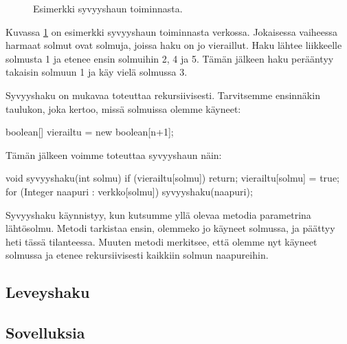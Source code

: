 \begin{figure}
\begin{center}
\end{center}
\caption{Esimerkki syvyyshaun toiminnasta.}
\label{fig:syvhak}
\end{figure}

Kuvassa \ref{fig:syvhak} on esimerkki syvyyshaun toiminnasta verkossa.
Jokaisessa vaiheessa harmaat solmut ovat solmuja,
joissa haku on jo vieraillut.
Haku lähtee liikkeelle solmusta 1 ja etenee ensin
solmuihin 2, 4 ja 5.
Tämän jälkeen haku perääntyy takaisin solmuun 1
ja käy vielä solmussa 3.

Syvyyshaku on mukavaa toteuttaa rekursiivisesti.
Tarvitsemme ensinnäkin taulukon, joka kertoo,
missä solmuissa olemme käyneet:

\begin{code}
boolean[] vierailtu = new boolean[n+1];
\end{code}

Tämän jälkeen voimme toteuttaa syvyyshaun näin:

\begin{code}
void syvyyshaku(int solmu) {
    if (vierailtu[solmu]) return;
    vierailtu[solmu] = true;
    for (Integer naapuri : verkko[solmu]) {
        syvyyshaku(naapuri);
    }
}
\end{code}

Syvyyshaku käynnistyy, kun kutsumme yllä olevaa metodia
parametrina lähtösolmu.
Metodi tarkistaa ensin, olemmeko jo käyneet solmussa,
ja päättyy heti tässä tilanteessa.
Muuten metodi merkitsee, että olemme nyt käyneet solmussa
ja etenee rekursiivisesti kaikkiin solmun naapureihin.

\subsection{Leveyshaku}

\subsection{Sovelluksia}
